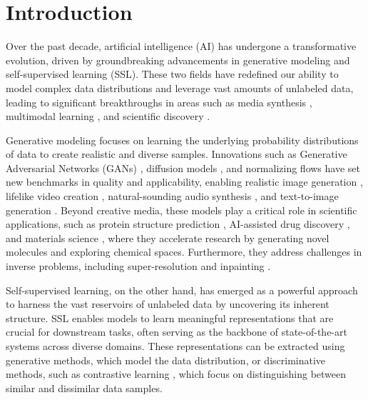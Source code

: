 
\chapter{Introduction}

Over the past decade, artificial intelligence (AI) has undergone a transformative evolution, driven by groundbreaking advancements in generative modeling and self-supervised learning (SSL). These two fields have redefined our ability to model complex data distributions and leverage vast amounts of unlabeled data, leading to significant breakthroughs in areas such as media synthesis \cite{karras2019style, ramesh2021zero, esser2021taming, kong2020diffwave}, multimodal learning \cite{radford2021learning, xu2021videoclip, wang2022image}, and scientific discovery \cite{jumper2021highly, stokes2020deep, rives2021biological, zhang2021unified}.

Generative modeling focuses on learning the underlying probability distributions of data to create realistic and diverse samples. Innovations such as Generative Adversarial Networks (GANs) \cite{goodfellow2014generative}, diffusion models \cite{ho2020denoising, song2021score}, and normalizing flows \cite{rezende2015variational, papamakarios2019normalizing} have set new benchmarks in quality and applicability, enabling realistic image generation \cite{karras2019style}, lifelike video creation \cite{esser2021taming}, natural-sounding audio synthesis \cite{kong2020diffwave}, and text-to-image generation \cite{ramesh2021zero}. Beyond creative media, these models play a critical role in scientific applications, such as protein structure prediction \cite{jumper2021highly, baek2021accurate}, AI-assisted drug discovery \cite{stokes2020deep, gentile2020deep}, and materials science \cite{butler2018machine}, where they accelerate research by generating novel molecules and exploring chemical spaces. Furthermore, they address challenges in inverse problems, including super-resolution \cite{saharia2022image, wang2024sinsr} and inpainting \cite{suvorov2022resolution, lugmayr2022repaint}.

Self-supervised learning, on the other hand, has emerged as a powerful approach to harness the vast reservoirs of unlabeled data by uncovering its inherent structure. SSL enables models to learn meaningful representations that are crucial for downstream tasks, often serving as the backbone of state-of-the-art systems across diverse domains. These representations can be extracted using generative methods, which model the data distribution, or discriminative methods, such as contrastive learning \cite{chen2020simple}, which focus on distinguishing between similar and dissimilar data samples.

